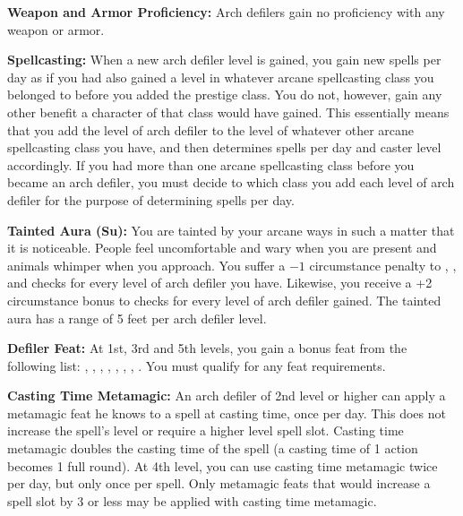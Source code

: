 {
\textbf{Weapon and Armor Proficiency:} Arch defilers gain no proficiency with any weapon or armor.

\textbf{Spellcasting:} When a new arch defiler level is gained, you gain new spells per day as if you had also gained a level in whatever arcane spellcasting class you belonged to before you added the prestige class. You do not, however, gain any other benefit a character of that class would have gained. This essentially means that you add the level of arch defiler to the level of whatever other arcane spellcasting class you have, and then determines spells per day and caster level accordingly. If you had more than one arcane spellcasting class before you became an arch defiler, you must decide to which class you add each level of arch defiler for the purpose of determining spells per day.

\textbf{Tainted Aura (Su):} You are tainted by your arcane ways in such a matter that it is noticeable. People feel uncomfortable and wary when you are present and animals whimper when you approach. You suffer a $-1$ circumstance penalty to , ,  and  checks for every level of arch defiler you have. Likewise, you receive a +2 circumstance bonus to  checks for every level of arch defiler gained. The tainted aura has a range of 5 feet
per arch defiler level.

\textbf{Defiler Feat:} At 1st, 3rd and 5th levels, you gain a bonus feat from the following list: , , , , , , , . You must qualify for any feat requirements.

\textbf{Casting Time Metamagic:} An arch defiler of 2nd level or higher can apply a metamagic feat he knows to a spell at casting time, once per day. This does not increase the spell's level or require a higher level spell slot. Casting time metamagic doubles the casting time of the spell (a casting time of 1 action becomes 1 full round). At 4th level, you can use casting time metamagic twice per day, but only once per spell. Only metamagic feats that would increase a spell slot by 3 or less may be applied with casting time metamagic.

}
